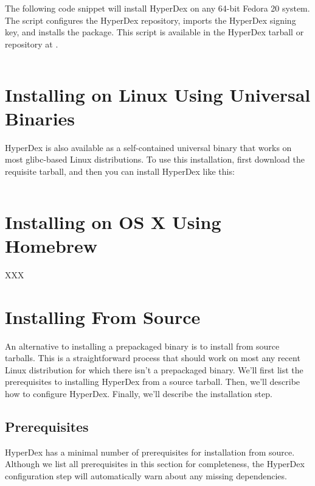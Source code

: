The following code snippet will install HyperDex on any 64-bit Fedora 20 system.
The script configures the HyperDex repository, imports the HyperDex signing key,
and installs the  package.  This script is available in the
HyperDex tarball or repository at .

\inputminted[frame=lines,framesep=2mm,firstline=5]{bash}{\topdir/install/fedora-packages.sh}

\section{Installing on Linux Using Universal Binaries}
\label{sec:installation:universal-linux}

HyperDex is also available as a self-contained universal binary that works on
most glibc-based Linux distributions.  To use this installation, first download
the requisite tarball, and then you can install HyperDex like this:

\inputminted[frame=lines,framesep=2mm,firstline=3]{bash}{\topdir/install/linux-amd64.sh}

\section{Installing on OS X Using Homebrew}
\label{sec:installation:os-x-homebrew}

XXX

\section{Installing From Source}
\label{sec:installation:source}


An alternative to installing a prepackaged binary is to install from source
tarballs.  This is a straightforward process that should work on most any recent
Linux distribution for which there isn't a prepackaged binary.  We'll first list
the prerequisites to installing HyperDex from a source tarball.  Then, we'll
describe how to configure HyperDex.  Finally, we'll describe the installation
step.

\subsection{Prerequisites}
\label{sec:installation:source:deps}

HyperDex has a minimal number of prerequisites for installation from source.
Although we list all prerequisites in this section for completeness, the
HyperDex configuration step will automatically warn about any missing
dependencies.

